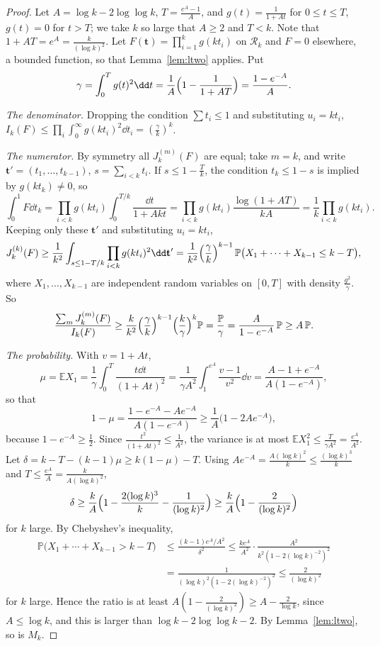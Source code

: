 \begin{proof}
Let $A=\log k-2\log\log k$, $T=\frac{e^A-1}A$, and $g(t)=\frac1{1+At}$ for $0\le t\le T$, $g(t)=0$ for $t>T$; we take $k$ so large that $A\ge2$ and $T<k$. Note that $1+AT=e^A=\frac k{(\log k)^2}$. Let $F(\mathbf t)=\prod_{i=1}^kg(kt_i)$ on $\mathcal R_k$ and $F=0$ elsewhere, a bounded function, so that Lemma~\ref{lem:ltwo} applies. Put
\[
\gamma=\int_0^Tg(t)^2\dd t=\frac1A\Bigl(1-\frac1{1+AT}\Bigr)=\frac{1-e^{-A}}A.
\]

\emph{The denominator.} Dropping the condition $\sum t_i\le1$ and substituting $u_i=kt_i$, $I_k(F)\le\prod_i\int_0^\infty g(kt_i)^2\dd t_i=(\frac\gamma k)^k$.

\emph{The numerator.} By symmetry all $J_k^{(m)}(F)$ are equal; take $m=k$, and write $\mathbf t'=(t_1,\dots,t_{k-1})$, $s=\sum_{i<k}t_i$. If $s\le1-\frac Tk$, the condition $t_k\le1-s$ is implied by $g(kt_k)\ne0$, so
\[
\int_0^1F\dd t_k=\prod_{i<k}g(kt_i)\int_0^{T/k}\frac{\dd t}{1+Akt}=\prod_{i<k}g(kt_i)\frac{\log(1+AT)}{kA}=\frac1k\prod_{i<k}g(kt_i).
\]
Keeping only these $\mathbf t'$ and substituting $u_i=kt_i$,
\[
J_k^{(k)}(F)\ge\frac1{k^2}\int_{s\le1-T/k}\prod_{i<k}g(kt_i)^2\dd\mathbf t'=\frac1{k^2}\Bigl(\frac\gamma k\Bigr)^{k-1}\,\mathbb P\bigl(X_1+\cdots+X_{k-1}\le k-T\bigr),
\]
where $X_1,\dots,X_{k-1}$ are independent random variables on $[0,T]$ with density $\frac{g^2}\gamma$. So
\[
\frac{\sum_mJ_k^{(m)}(F)}{I_k(F)}\ge\frac{k}{k^2}\Bigl(\frac\gamma k\Bigr)^{k-1}\Bigl(\frac k\gamma\Bigr)^k\mathbb P=\frac{\mathbb P}\gamma=\frac{A}{1-e^{-A}}\,\mathbb P\ge A\,\mathbb P.
\]

\emph{The probability.} With $v=1+At$,
\[
\mu=\mathbb E X_1=\frac1\gamma\int_0^T\frac{t\dd t}{(1+At)^2}=\frac1{\gamma A^2}\int_1^{e^A}\frac{v-1}{v^2}\dd v=\frac{A-1+e^{-A}}{A(1-e^{-A})},
\]
so that
\[
1-\mu=\frac{1-e^{-A}-Ae^{-A}}{A(1-e^{-A})}\ge\frac1A\bigl(1-2Ae^{-A}\bigr),
\]
because $1-e^{-A}\ge\frac12$. Since $\frac{t^2}{(1+At)^2}\le\frac1{A^2}$, the variance is at most $\mathbb EX_1^2\le\frac T{\gamma A^2}=\frac{e^A}{A^2}$. Let $\delta=k-T-(k-1)\mu\ge k(1-\mu)-T$. Using $Ae^{-A}=\frac{A(\log k)^2}k\le\frac{(\log k)^3}k$ and $T\le\frac{e^A}A=\frac k{A(\log k)^2}$,
\[
\delta\ge\frac kA\Bigl(1-\frac{2(\log k)^3}k-\frac1{(\log k)^2}\Bigr)\ge\frac kA\Bigl(1-\frac2{(\log k)^2}\Bigr)
\]
for $k$ large. By Chebyshev's inequality,
\[
\begin{aligned}\mathbb P\bigl(X_1+\cdots+X_{k-1}>k-T\bigr)&\le\frac{(k-1)e^A/A^2}{\delta^2}\le\frac{ke^A}{A^2}\cdot\frac{A^2}{k^2(1-2(\log k)^{-2})^2}\\&=\frac1{(\log k)^2(1-2(\log k)^{-2})^2}\le\frac2{(\log k)^2}\end{aligned}
\]
for $k$ large. Hence the ratio is at least $A(1-\frac2{(\log k)^2})\ge A-\frac2{\log k}$, since $A\le\log k$, and this is larger than $\log k-2\log\log k-2$. By Lemma~\ref{lem:ltwo}, so is $M_k$.
\end{proof}

